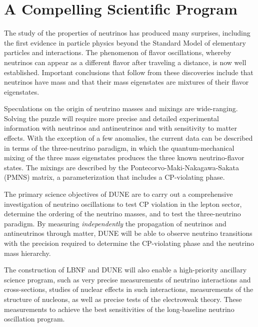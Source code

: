 \section{A Compelling Scientific Program}

The study of the properties of neutrinos has produced %
many surprises, including the first evidence in particle physics beyond the Standard Model of elementary particles and interactions.   The phenomenon of flavor oscillations, whereby neutrinos can 
appear as a different flavor after traveling a distance, %
is now well established. Important conclusions that follow from these discoveries include that neutrinos have mass and that their %
mass eigenstates are mixtures of their %
flavor eigenstates.

Speculations on the origin of neutrino masses and mixings are wide-ranging. 
Solving the puzzle will require more precise and detailed experimental information with neutrinos and antineutrinos and with sensitivity to matter effects. With the exception of a few anomalies, the current data can be described in terms of the three-neutrino paradigm, in which the 
quantum-mechanical mixing of the three mass eigenstates produces the three known neutrino-flavor states.  The mixings are described by the Pontecorvo-Maki-Nakagawa-Sakata (PMNS) matrix, a parameterization that includes a CP-violating phase. 

The primary science objectives %
of DUNE are to carry out a comprehensive investigation of neutrino oscillations to test CP violation in the lepton sector, determine the ordering of the neutrino masses, and to test the three-neutrino paradigm.
By measuring \textit{independently} the  propagation of neutrinos and antineutrinos through matter, DUNE will be able to observe %
neutrino transitions with the precision required to determine the 
CP-violating phase and %
the neutrino mass hierarchy.

The construction of LBNF and DUNE will also enable a high-priority ancillary science program, such as 
very precise measurements of neutrino interactions and cross-sections, studies of nuclear effects in such interactions, measurements of the structure of nucleons, as well as precise tests of the electroweak theory. 
These measurements  %
to achieve the best sensitivities of the long-baseline neutrino oscillation program. %

